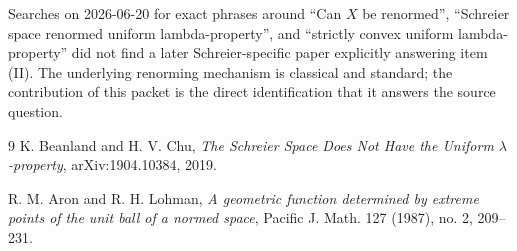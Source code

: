 \documentclass[11pt]{article}
\begin{document}
Searches on 2026-06-20 for exact phrases around ``Can $X$ be renormed'', ``Schreier space renormed uniform lambda-property'', and ``strictly convex uniform lambda-property'' did not find a later Schreier-specific paper explicitly answering item (II). The underlying renorming mechanism is classical and standard; the contribution of this packet is the direct identification that it answers the source question.

\begin{thebibliography}{9}
K. Beanland and H. V. Chu,
\emph{The Schreier Space Does Not Have the Uniform $\lambda$-property},
arXiv:1904.10384, 2019.

R. M. Aron and R. H. Lohman,
\emph{A geometric function determined by extreme points of the unit ball of a normed space},
Pacific J. Math. 127 (1987), no. 2, 209--231.
\end{thebibliography}
\end{document}
